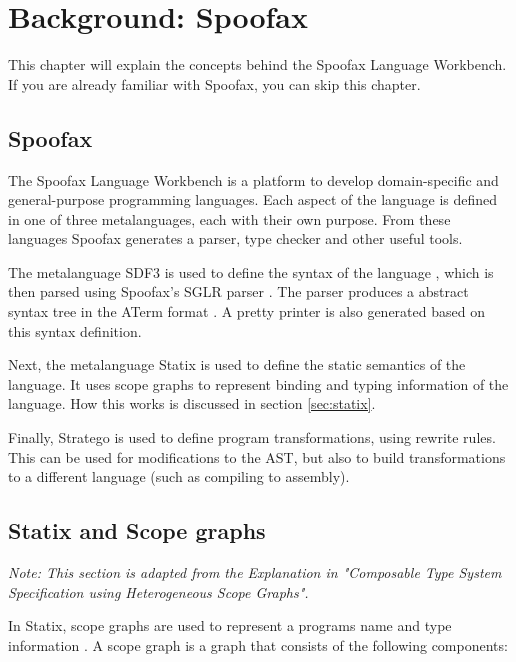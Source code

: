 \chapter{\label{chap:bg-spoofax}Background: Spoofax}

This chapter will explain the concepts behind the Spoofax Language Workbench. If you are already familiar with Spoofax, you can skip this chapter. 

\section{Spoofax}

The Spoofax Language Workbench \cite{spoofax} is a platform to develop domain-specific and
general-purpose programming languages. Each aspect of the language is defined in one of three metalanguages, each with their own purpose. From these languages Spoofax generates a parser, type checker and other useful tools. 

The metalanguage SDF3 is used to define the syntax of the language \cite{sdf3}, which is then parsed using Spoofax's SGLR parser \cite{sdf3_parser}. The parser produces a abstract syntax tree in the ATerm format \cite{aterm}. A pretty printer is also generated based on this syntax definition. 

Next, the metalanguage Statix \cite{scopes_as_types} is used to define the static semantics of the language. It uses scope graphs to represent binding and typing information of the language. How this works is discussed in section \ref{sec:statix}.

Finally, Stratego \cite{stratego} is used to define program transformations, using rewrite rules. This can be used for modifications to the AST, but also to build transformations to a different language (such as compiling to assembly). 

\section{\label{sec:statix}Statix and Scope graphs}

\textit{Note: This section is adapted from the Explanation in "Composable Type System Specification
	using Heterogeneous Scope Graphs". \cite[sect. 4.1.2]{Zwaan21}}

In Statix, scope graphs are used to represent a programs name and type information \cite{scopes_as_types}. A scope graph is a graph that consists of the following components:

